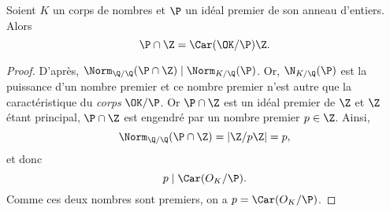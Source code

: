 \documentclass[a4paper, 12pt, oneside]{article}
\begin{document}
\begin{fait*} Soient $K$ un corps de nombres et $\P$ un idéal premier de son anneau d'entiers. Alors $$\P\cap \Z = \Car(\OK/\P)\Z.$$
\end{fait*}

\begin{proof}
	D'après, $\Norm_{\Q/\Q}(\P\cap\Z)\mid \Norm_{K/\Q}(\P)$. Or, $\N_{K/\Q}(\P)$ est la puissance d'un nombre premier et ce nombre premier n'est autre que la caractéristique du \textit{corps} $\OK/\P$. Or $\P\cap \Z$ est un idéal premier de $\Z$ et $\Z$ étant principal, $\P\cap \Z$ est engendré par un nombre premier $p\in \Z$. Ainsi, $$\Norm_{\Q/\Q}(\P\cap \Z) = |\Z/p\Z| = p,$$ et donc $$p\mid \Car(O_K/\P).$$ Comme ces deux nombres sont premiers, on a $p = \Car(O_K/\P)$.
\end{proof}

\nocite{*}
\printbibliography
\end{document}
